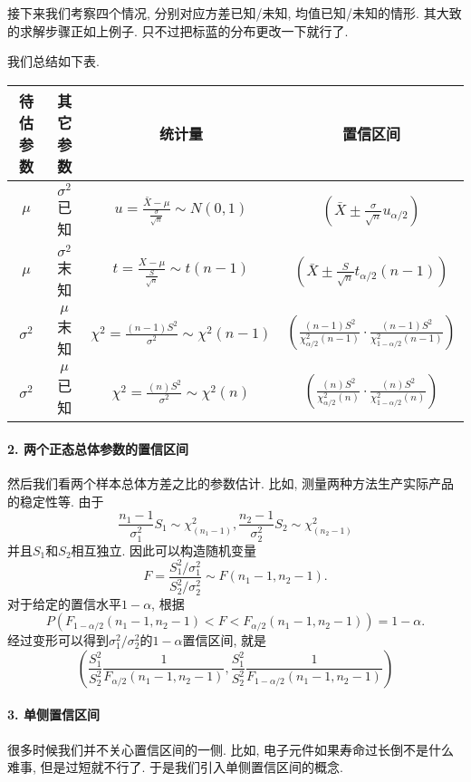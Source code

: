 接下来我们考察四个情况, 分别对应方差已知/未知, 均值已知/未知的情形. 其大致的求解步骤正如上例子. 只不过把标蓝的分布更改一下就行了. 

我们总结如下表. 

\begin{tabular}{|c|c|c|c|}
    \hline 待估参数 & 其它参数 & 统计量 & 置信区间 \\
     \hline $\mu$ & $\sigma^2$ 已知 & $u=\frac{\bar{X}-\mu}{\frac{\sigma}{\sqrt{n}}} \sim N(0,1)$ & $\left(\bar{X} \pm \frac{\sigma}{\sqrt{n}} u_{\alpha/2}\right)$ \\
    \hline  $\mu$ & $\sigma^{2}$ 末知 & $t=\frac{X-\mu}{\frac{S}{\sqrt{n}}} \sim t(n-1)$ & $\left(\bar{X} \pm \frac{S}{\sqrt{n}}t_{\alpha/2}(n-1)\right)$ \\
     \hline $\sigma^{2}$ & $\mu$ 末知 & $\chi^2=\frac{(n-1) S^2}{\sigma^2} \sim \chi^2(n-1)$ & $\left(\frac{(n-1) S^2}{\chi_{\alpha/2}^2(n-1)} \cdot \frac{(n-1) S^2}{\chi_{1-\alpha/2}^2(n-1)}\right)$ \\
     \hline $\sigma^{2}$ & $\mu$ 已知 & $\chi^2=\frac{(n) S^2}{\sigma^2} \sim \chi^2(n)$ & $\left(\frac{(n) S^2}{\chi_{\alpha/2}^2(n)} \cdot \frac{(n) S^2}{\chi_{1-\alpha/2}^2(n)}\right)$ \\
    \hline
    \end{tabular}

\paragraph{2. 两个正态总体参数的置信区间}然后我们看两个样本总体方差之比的参数估计. 比如, 测量两种方法生产实际产品的稳定性等. 由于
\[
    \frac{n_1-1}{\sigma_1^2}S_1\sim \chi^2_{(n_1-1)}, \frac{n_2-1}{\sigma_2^2}S_2\sim \chi^2_{(n_2-1)}
\]
并且$S_1$和$S_2$相互独立. 因此可以构造随机变量
\[
    F=\frac{S_1^2/\sigma_1^2}{S_2^2/\sigma_2^2}\sim F(n_1-1, n_2-1). 
\]
对于给定的置信水平$1-\alpha$, 根据
\[
    P(F_{1-\alpha/2}(n_1-1, n_2-1)<F<F_{\alpha/2}(n_1-1, n_2-1))=1-\alpha.
\]
经过变形可以得到$\sigma_1^2/\sigma_2^2$的$1-\alpha$置信区间, 就是
\[
    \left(
        \frac{S_1^2}{S_2^2}\frac{1}{F_{\alpha/2}(n_1-1, n_2-1)}, 
        \frac{S_1^2}{S_2^2}\frac{1}{F_{1-\alpha/2}(n_1-1, n_2-1)} 
    \right)
\]

\paragraph{3. 单侧置信区间} 很多时候我们并不关心置信区间的一侧. 比如, 电子元件如果寿命过长倒不是什么难事, 但是过短就不行了. 于是我们引入单侧置信区间的概念. 

